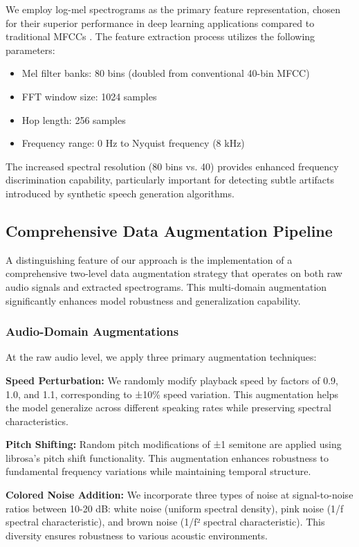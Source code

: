 \documentclass[conference]{IEEEtran}
\begin{document}
We employ log-mel spectrograms as the primary feature representation, chosen for their superior performance in deep learning applications compared to traditional MFCCs \cite{hershey2017cnn}. The feature extraction process utilizes the following parameters:
\begin{itemize}
\item Mel filter banks: 80 bins (doubled from conventional 40-bin MFCC)
\item FFT window size: 1024 samples
\item Hop length: 256 samples  
\item Frequency range: 0 Hz to Nyquist frequency (8 kHz)
\end{itemize}

The increased spectral resolution (80 bins vs. 40) provides enhanced frequency discrimination capability, particularly important for detecting subtle artifacts introduced by synthetic speech generation algorithms.

\subsection{Comprehensive Data Augmentation Pipeline}

A distinguishing feature of our approach is the implementation of a comprehensive two-level data augmentation strategy that operates on both raw audio signals and extracted spectrograms. This multi-domain augmentation significantly enhances model robustness and generalization capability.

\subsubsection{Audio-Domain Augmentations}
At the raw audio level, we apply three primary augmentation techniques:

\textbf{Speed Perturbation:} We randomly modify playback speed by factors of 0.9, 1.0, and 1.1, corresponding to ±10\% speed variation. This augmentation helps the model generalize across different speaking rates while preserving spectral characteristics.

\textbf{Pitch Shifting:} Random pitch modifications of ±1 semitone are applied using librosa's pitch shift functionality. This augmentation enhances robustness to fundamental frequency variations while maintaining temporal structure.

\textbf{Colored Noise Addition:} We incorporate three types of noise at signal-to-noise ratios between 10-20 dB: white noise (uniform spectral density), pink noise (1/f spectral characteristic), and brown noise (1/f² spectral characteristic). This diversity ensures robustness to various acoustic environments.
\end{document}
